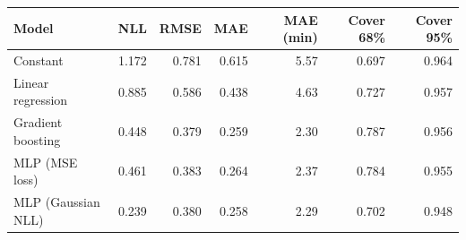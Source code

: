 \begin{tabular}{lrrrrrr}
\toprule
Model & NLL & RMSE & MAE & MAE (min) & Cover 68\% & Cover 95\% \\
\midrule
Constant & 1.172 & 0.781 & 0.615 & 5.57 & 0.697 & 0.964 \\
Linear regression & 0.885 & 0.586 & 0.438 & 4.63 & 0.727 & 0.957 \\
Gradient boosting & 0.448 & 0.379 & 0.259 & 2.30 & 0.787 & 0.956 \\
MLP (MSE loss) & 0.461 & 0.383 & 0.264 & 2.37 & 0.784 & 0.955 \\
MLP (Gaussian NLL) & 0.239 & 0.380 & 0.258 & 2.29 & 0.702 & 0.948 \\
\bottomrule
\end{tabular}
